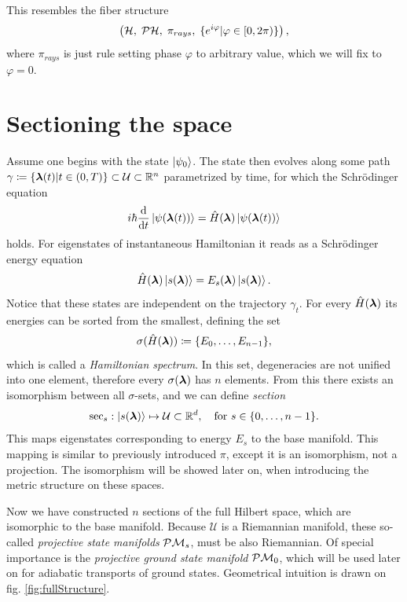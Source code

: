 This resembles the fiber structure
$$\left(\mathcal{H},\;\mathcal{P}\mathcal{H},\;\pi_{rays},\;\{e^{i\varphi}| \varphi\in[0,2\pi)\}\right),$$
where $\pi_{rays}$ is just rule setting phase $\varphi$ to arbitrary value, which we will fix to $\varphi=0$.







\section{Sectioning the space}
Assume one begins with the state $\ket{\psi_0}$. The state then evolves along some path $\gamma\coloneqq\{{\bm\lambda}(t)|t\in(0,T)\}\subset \mathcal U \subset \mathbb{R}^n$ parametrized by time, for which the Schr\"odinger equation
\begin{equation}
    i\hbar \frac{\mathrm{d} }{\mathrm{d} t}\ket{\psi({\bm\lambda}(t))} = \hat{H}({\bm\lambda})\ket{\psi({\bm\lambda}(t))}
    \label{eq:schrodinger}
\end{equation}
holds. For eigenstates of instantaneous Hamiltonian it reads as a Schr\"odinger energy equation
\begin{equation}
    \hat{H}({\bm\lambda})\ket{s({\bm\lambda})}=E_s({\bm\lambda})\ket{s({\bm\lambda})}.
    \label{eq:energySchrodinger}
\end{equation}
Notice that these states are independent on the trajectory $\gamma_t$.
For every $\hat{H}({\bm\lambda})$ its energies can be sorted from the smallest, defining the set 
\begin{equation}
    \sigma(\hat{H}({\bm\lambda}))\coloneqq\{E_0,\dots,E_{n-1}\},
\end{equation}
which is called a \emph{Hamiltonian spectrum}. In this set, degeneracies are not unified into one element, therefore every $\sigma({\bm\lambda})$ has $n$ elements. From this there exists an isomorphism between all $\sigma$-sets, and we can define \emph{section} 
$$\mathrm{sec}_s: \ket{s({\bm\lambda})}\mapsto \mathcal{U}\subset \mathbb{R}^d, \quad \text{for } s\in\{0,\dots, n-1\}.$$
This maps eigenstates corresponding to energy $E_s$ to the base manifold. This mapping is similar to previously introduced $\pi$, except it is an isomorphism, not a projection. The isomorphism will be showed later on, when introducing the metric structure on these spaces.

Now we have constructed $n$ sections of the full Hilbert space, which are isomorphic to the base manifold. Because $\mathcal U$ is a Riemannian manifold, these so-called \emph{projective state manifolds} $\mathcal{P}\mathcal{M}_s$, must be also Riemannian.
Of special importance is the \emph{projective ground state manifold} $\mathcal{P}\mathcal{M}_0$, which will be used later on for adiabatic transports of ground states. Geometrical intuition is drawn on fig. \ref{fig:fullStructure}. 


